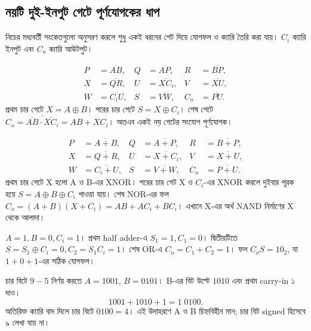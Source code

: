 \subsection{নয়টি দুই-ইনপুট গেটে পূর্ণযোগকের ধাপ}
নিচের মধ্যবর্তী সংকেতগুলো অনুসরণ করলে শুধু একই ধরনের গেট দিয়ে যোগফল ও ক্যারি তৈরি করা যায়। $C_i$ ক্যারি ইনপুট এবং $C_o$ ক্যারি আউটপুট।

\[\begin{aligned}
P&=\overline{AB},&Q&=\overline{AP},&R&=\overline{BP},\\
X&=\overline{QR},&U&=\overline{XC_i},&V&=\overline{XU},\\
W&=\overline{C_iU},&S&=\overline{VW},&C_o&=\overline{PU}.
\end{aligned}\]
প্রথম চার গেটে $X=A\oplus B$। পরের চার গেটে $S=X\oplus C_i$। শেষ গেটে $C_o=\overline{\overline{AB}\cdot\overline{XC_i}}=AB+XC_i$। অতএব একই নয় গেটের সংযোগ পূর্ণযোগক।

\[\begin{aligned}
P&=\overline{A+B},&Q&=\overline{A+P},&R&=\overline{B+P},\\
X&=\overline{Q+R},&U&=\overline{X+C_i},&V&=\overline{X+U},\\
W&=\overline{C_i+U},&S&=\overline{V+W},&C_o&=\overline{P+U}.
\end{aligned}\]
প্রথম চার গেটে X হলো A ও B-এর XNOR। পরের চার গেট X ও $C_i$-এর XNOR করলে দুইবার পূরক হয়ে $S=A\oplus B\oplus C_i$ পাওয়া যায়। শেষ NOR-এর ফল $C_o=(A+B)(X+C_i)=AB+AC_i+BC_i$। এখানে X-এর অর্থ NAND নির্মাণের X থেকে আলাদা।

$A=1,B=0,C_i=1$।
\chThreeAnswer প্রথম half adder-এ $S_1=1,C_1=0$। দ্বিতীয়টিতে $S=S_1\oplus C_i=0,C_2=S_1C_i=1$। শেষ OR-এ $C_o=C_1+C_2=1$। ফল $C_oS=10_2$, যা $1+0+1$-এর সঠিক যোগফল।

চার বিটে $9-5$ নির্ণয় করতে $A=1001$, $B=0101$।
\chThreeAnswer B-এর বিট উল্টে $1010$ এবং প্রথম carry-in ১ দাও।
\[1001+1010+1=1\;0100.\]
অতিরিক্ত ক্যারি বাদ দিলে চার বিটে $0100=4$। এই উদাহরণে A ও B চিহ্নবিহীন মান; চার বিট signed হিসেবে ৯ লেখা যায় না।
